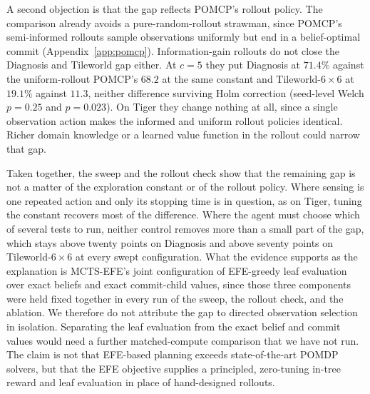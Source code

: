 A second objection is that the gap reflects POMCP's rollout policy. The comparison already avoids a pure-random-rollout strawman, since POMCP's semi-informed rollouts sample observations uniformly but end in a belief-optimal commit (Appendix~\ref{app:pomcp}). Information-gain rollouts do not close the Diagnosis and Tileworld gap either. At $c{=}5$ they put Diagnosis at $71.4\%$ against the uniform-rollout POMCP's $68.2$ at the same constant and Tileworld-$6{\times}6$ at $19.1\%$ against $11.3$, neither difference surviving Holm correction (seed-level Welch $p{=}0.25$ and $p{=}0.023$). On Tiger they change nothing at all, since a single observation action makes the informed and uniform rollout policies identical. Richer domain knowledge or a learned value function in the rollout could narrow that gap.

Taken together, the sweep and the rollout check show that the remaining gap is not a matter of the exploration constant or of the rollout policy. Where sensing is one repeated action and only its stopping time is in question, as on Tiger, tuning the constant recovers most of the difference. Where the agent must choose which of several tests to run, neither control removes more than a small part of the gap, which stays above twenty points on Diagnosis and above seventy points on Tileworld-$6{\times}6$ at every swept configuration. What the evidence supports as the explanation is MCTS-EFE's joint configuration of EFE-greedy leaf evaluation over exact beliefs and exact commit-child values, since those three components were held fixed together in every run of the sweep, the rollout check, and the ablation. We therefore do not attribute the gap to directed observation selection in isolation. Separating the leaf evaluation from the exact belief and commit values would need a further matched-compute comparison that we have not run. The claim is not that EFE-based planning exceeds state-of-the-art POMDP solvers, but that the EFE objective supplies a principled, zero-tuning in-tree reward and leaf evaluation in place of hand-designed rollouts.

